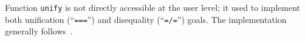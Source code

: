 Function \lstinline{unify} is not directly accessible at the user level; it used
to implement both unification (``\lstinline{===}'') and disequality (``\lstinline{=/=}'') 
goals. The implementation generally follows~\cite{CKanren}.


\begin{comment}

We argue, that the following three invariants are maintained for any substitution $s$, involved in the unification:

\begin{enumerate}
\item if \mbox{$t_1^{\_}[x^{\tau}]$} and \mbox{$t_2^{\_}[x^{\rho}]$}~--- two arbitrary terms (in particular, 
$t_1^{\_}$ and $t_2^{\_}$ may be the same), bound in $s$ and containing occurrences of variable $x$, 
then $\rho=\tau$ (different occurrences of the same variable in $s$ are attributed with the same type);

\item if \mbox{$(s\;\;x^\tau)$} is defined, then \mbox{$(s\;\;x^\tau) = t^\tau$} (a substitution always
binds a variable to a term of the same type);

\item each variable in $s$ preserves its type, assigned by the compiler (from the first two invariants 
it follows, that this type is unique; note also, that all variables are created and have their types assigned outside 
unification, in a type-safe world).
\end{enumerate}

The initial (empty) substitution trivially fulfills these invariants; hence, it is sufficient
to show, that they are preserved by unification.
\end{comment}
